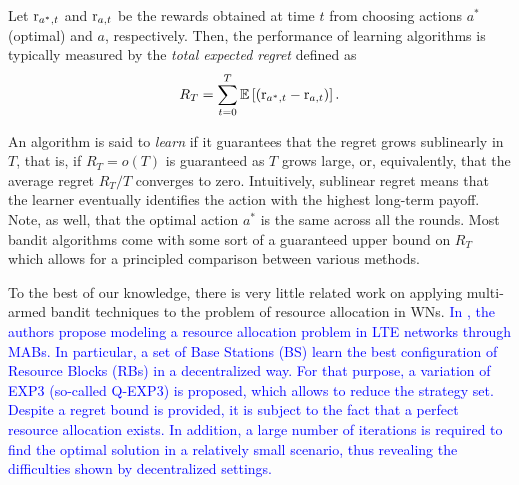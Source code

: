 \documentclass[10pt,journal,compsoc]{IEEEtran}
\newcommand{\francesc}[1]{\textcolor{blue}{#1}}
\begin{document}
	Let ${\rm r}_{a^*,t}$ and ${\rm r}_{a,t}$ be the rewards obtained at time $t$ from choosing actions $a^*$ (optimal) and $a$, respectively. Then, the performance of learning algorithms is typically measured by the \emph{total expected regret} defined as  \[R_T = \sum_{t=0}^{T} \mathbb{E}\left[\left({\rm r}_{a^*,t} - {\rm r}_{a,t}\right)\right].\]
	
	An algorithm is said to \emph{learn} if it guarantees that the regret grows sublinearly in $T$, that is, if $R_T = o(T)$ is guaranteed as $T$ grows large, or, equivalently, that the average regret $R_T/T$ converges to zero. Intuitively, sublinear regret means that the learner eventually identifies the action with the highest long-term payoff. Note, as well, that the optimal action $a^*$ is the same across all the rounds. Most bandit algorithms come with some sort of a guaranteed upper bound on $R_T$ which allows for a principled comparison between various methods. 
	
	To the best of our knowledge, there is very little related work on applying multi-armed bandit techniques to the problem of resource allocation in WNs. \francesc{In \cite{coucheney2015multi}, the authors propose modeling a resource allocation problem in LTE networks through MABs. In particular, a set of Base Stations (BS) learn the best configuration of Resource Blocks (RBs) in a decentralized way. For that purpose, a variation of EXP3 (so-called Q-EXP3) is proposed, which allows to reduce the strategy set. Despite a regret bound is provided, it is subject to the fact that a perfect resource allocation exists. In addition, a large number of iterations is required to find the optimal solution in a relatively small scenario, thus revealing the difficulties shown by decentralized settings.}
	
\end{document}

